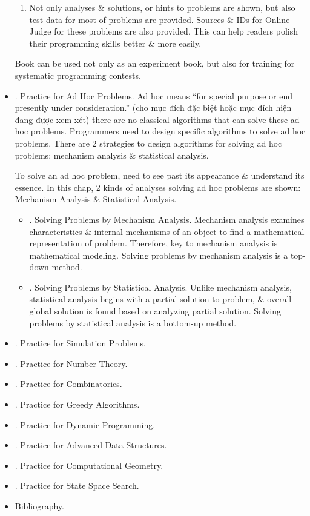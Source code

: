 \documentclass{article}
\begin{document}
\begin{itemize}
\begin{enumerate}
		\item Not only analyses \& solutions, or hints to problems are shown, but also test data for most of problems are provided. Sources \& IDs for Online Judge for these problems are also provided. This can help readers polish their programming skills better \& more easily.
	\end{enumerate}
	Book can be used not only as an experiment book, but also for training for systematic programming contests.
	\item {. Practice for Ad Hoc Problems.} Ad hoc means ``for special purpose or end presently under consideration.'' (cho mục đích đặc biệt hoặc mục đích hiện đang được xem xét) there are no classical algorithms that can solve these ad hoc problems. Programmers need to design specific algorithms to solve ad hoc problems. There are 2 strategies to design algorithms for solving ad hoc problems: mechanism analysis \& statistical analysis.
	
	To solve an ad hoc problem, need to see past its appearance \& understand its essence. In this chap, 2 kinds of analyses solving ad hoc problems are shown: Mechanism Analysis \& Statistical Analysis.
	\begin{itemize}
		\item {. Solving Problems by Mechanism Analysis.} Mechanism analysis examines characteristics \& internal mechanisms of an object to find a mathematical representation of problem. Therefore, key to mechanism analysis is mathematical modeling. Solving problems by mechanism analysis is a top-down method.
		\item {. Solving Problems by Statistical Analysis.} Unlike mechanism analysis, statistical analysis begins with a partial solution to problem, \& overall global solution is found based on analyzing partial solution. Solving problems by statistical analysis is a bottom-up method.
	\end{itemize}
	\item {. Practice for Simulation Problems.}
	\item {. Practice for Number Theory.}
	\item {. Practice for Combinatorics.}
	\item {. Practice for Greedy Algorithms.}
	\item {. Practice for Dynamic Programming.}
	\item {. Practice for Advanced Data Structures.}
	\item {. Practice for Computational Geometry.}
	\item {. Practice for State Space Search.}
	\item {\sf Bibliography.}
\end{itemize}
\end{document}
